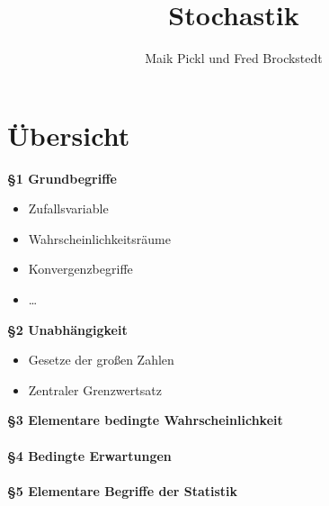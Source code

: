 \documentclass[10pt,a4paper]{report}
\author{Maik Pickl und Fred Brockstedt}
\title{Stochastik}
\numberwithin{equation}{section}
\numberwithin{figure}{section}
\theoremstyle{plain}
\theoremstyle{definition}
\theoremstyle{plain}
\theoremstyle{definition}
\theoremstyle{remark}
\theoremstyle{plain}
\theoremstyle{plain}
\theoremstyle{plain}
\newcommand{\1}{ \mathbb{1} } %
\begin{document}
\chapter*{Übersicht}
\textbf{\S 1 \qquad Grundbegriffe}
\begin{itemize}
\item Zufallsvariable
\item Wahrscheinlichkeitsräume
\item Konvergenzbegriffe
\item \dots
\end{itemize}
\textbf{\S 2 \qquad Unabhängigkeit}
\begin{itemize}
\item Gesetze der großen Zahlen
\item Zentraler Grenzwertsatz
\end{itemize}
\textbf{\S 3 \qquad Elementare bedingte Wahrscheinlichkeit}\\\\
\textbf{\S 4 \qquad Bedingte Erwartungen}\\\\
\textbf{\S 5 \qquad Elementare Begriffe der Statistik}\\\\
\end{document}
